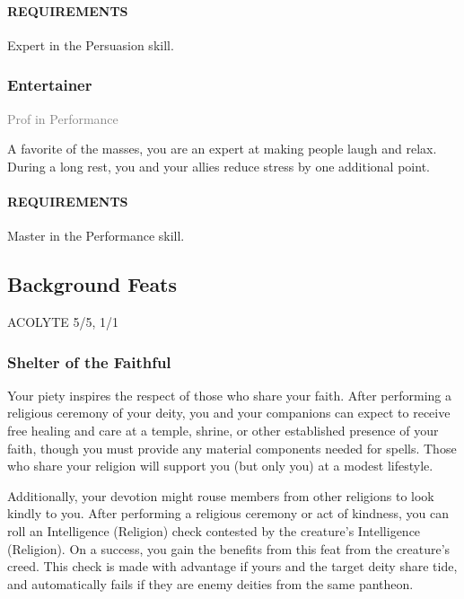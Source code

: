 \paragraph{REQUIREMENTS} Expert in the Persuasion skill.

\subsubsection{Entertainer} \label{feat::entertainer}
\small{\textcolor{gray}{Prof in Performance}}

\normalsize
A favorite of the masses, you are an expert at making people laugh and relax.
During a long rest, you and your allies reduce stress by one additional point.
\paragraph{REQUIREMENTS} Master in the Performance skill.

\subsection*{Background Feats}
ACOLYTE 5/5, 1/1
    \subsubsection{Shelter of the Faithful} \label{feat::shelterofthefaithful}
        Your piety inspires the respect of those who share your faith.
        After performing a religious ceremony of your deity, you and your companions can expect to receive free healing and care at a temple, shrine, or other established presence of your faith, though you must provide any material components needed for spells.
        Those who share your religion will support you (but only you) at a modest lifestyle.

        Additionally, your devotion might rouse members from other religions to look kindly to you.
        After performing a religious ceremony or act of kindness, you can roll an Intelligence (Religion) check contested by the creature's Intelligence (Religion).
        On a success, you gain the benefits from this feat from the creature's creed.
        This check is made with advantage if yours and the target deity share tide, and automatically fails if they are enemy deities from the same pantheon.

